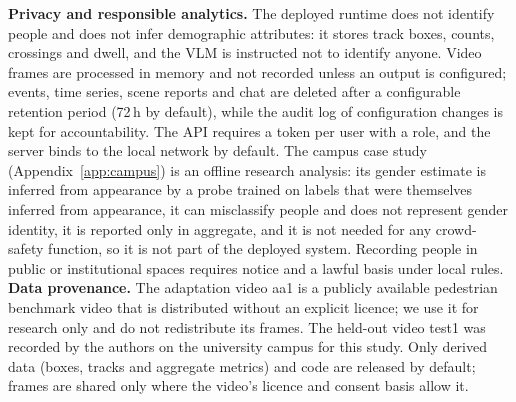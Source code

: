 \textbf{Privacy and responsible analytics.} The deployed runtime does not identify people and does not infer
demographic attributes: it stores track boxes, counts, crossings and dwell, and the VLM is instructed not to
identify anyone. Video frames are processed in memory and not recorded unless an output is configured; events,
time series, scene reports and chat are deleted after a configurable retention period (72\,h by default), while the
audit log of configuration changes is kept for accountability. The API requires a token per user with a role, and
the server binds to the local network by default. The campus case study (Appendix~\ref{app:campus}) is an offline
research analysis: its gender estimate is inferred from appearance by a probe trained on labels that were
themselves inferred from appearance, it can misclassify people and does not represent gender identity, it is
reported only in aggregate, and it is not needed for any crowd-safety function, so it is not part of the deployed
system. Recording people in public or institutional spaces requires notice and a lawful basis under local rules.
\textbf{Data provenance.} The adaptation video aa1 is a publicly available pedestrian benchmark video that is
distributed without an explicit licence; we use it for research only and do not redistribute its frames. The
held-out video test1 was recorded by the authors on the university campus for this study.
Only derived data (boxes, tracks and aggregate metrics) and code are released by default; frames are shared only
where the video's licence and consent basis allow it.
